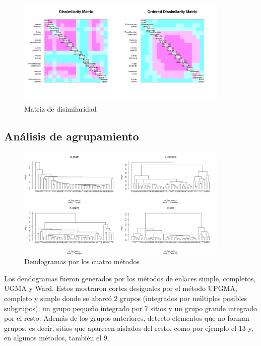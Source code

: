 \documentclass[11pt,]{article}
\begin{document}
\begin{figure}
\centering
\includegraphics[width=0.90000\textwidth]{Asociacion_variables_jaccard.png}
\caption{Matriz de
disimilaridad\label{fig:Representación de la asociación de variables de Jaccard}}
\end{figure}

\subsection{Análisis de agrupamiento}\label{anuxe1lisis-de-agrupamiento}

\begin{figure}
\centering
\includegraphics[width=0.90000\textwidth]{4_dendogramas.png}
\caption{Dendogramas por los cuatro métodos}
\end{figure}

Los dendogramas fueron generados por los métodos de enlaces simple,
completos, UGMA y Ward. Estos mostraron cortes desiguales por el método
UPGMA, completo y simple donde se abarcó 2 grupos (integrados por
múltiples posibles subgrupos); un grupo pequeño integrado por 7 sitios y
un grupo grande integrado por el resto. Además de los grupos anteriores,
detecto elementos que no forman grupos, es decir, sitios que aparecen
aislados del resto, como por ejemplo el 13 y, en algunos métodos,
también el 9.
\end{document}
